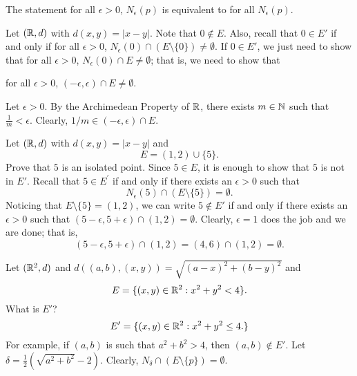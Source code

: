 \documentclass[a4paper]{report}
\begin{document}
\begin{remark}
    The statement for all \( \epsilon > 0 \), \( {N}_{\epsilon}(p) \) is equivalent to for all \( {N}_{\epsilon}(p) \).
\end{remark}

\begin{eg}
    Let \( (\mathbb{R}, d) \) with \( d(x,y) = | x - y |  \). Note that \(  0 \notin E  \). Also, recall that \( 0 \in E' \) if and only if for all \( \epsilon > 0  \), \( {N}_{\epsilon}(0) \cap (E \setminus  \{ 0  \} ) \neq \emptyset \). If \( 0 \in E' \), we just need to show that for all \( \epsilon > 0  \), \( {N}_{\epsilon}(0) \cap E \neq \emptyset \); that is, we need to show that  
    \begin{center}
        for all \( \epsilon > 0  \), \( (-\epsilon, \epsilon) \cap E \neq \emptyset \).
    \end{center}
    Let \( \epsilon > 0  \). By the Archimedean Property of \( \mathbb{R}  \), there exists \( m \in \mathbb{N}  \) such that \( \frac{ 1 }{ m }  < \epsilon  \). Clearly, \( 1/m \in (-\epsilon, \epsilon ) \cap E  \).
\end{eg}

\begin{eg}
   Let \( (\mathbb{R}, d) \) with \( d(x,y) = | x - y  |  \) and 
   \[  E = (1,2) \cup \{ 5  \}.  \]
   Prove that \( 5  \) is an isolated point.
   Since \( 5 \in E  \), it is enough to show that \( 5  \) is not in \( E' \). Recall that \( 5 \in E^{'}  \) if and only if there exists an \( \epsilon > 0  \) such that   
   \[  {N}_{\epsilon}(5) \cap (E \setminus  \{ 5 \} ) = \emptyset. \]
   Noticing that \( E \setminus  \{ 5  \} = (1,2) \), we can write \( 5 \notin E' \) if and only if there exists an \( \epsilon > 0  \) such that \( (5 - \epsilon , 5 + \epsilon) \cap (1,2) = \emptyset \). Clearly, \( \epsilon = 1  \) does the job and we are done; that is,
   \[  (5 - \epsilon, 5 + \epsilon) \cap (1,2) = (4, 6) \cap (1,2) = \emptyset. \]
\end{eg}

\begin{eg}
   Let \( (\mathbb{R}^{2}, d) \) and \( d((a,b),(x,y)) = \sqrt{ (a-x)^{2} + (b-y)^{2} }   \) 
   and 
   \[  E = \{ (x,y) \in \mathbb{R}^{2} : x^{2} + y^{2} < 4   \}. \]
   What is \( E' \)?
   \[  E' = \{ (x,y) \in \mathbb{R}^{2} : x^{2} + y^{2} \leq 4.  \}  \]
   For example, if \( (a,b) \) is such that \( a^{2} + b^{2} > 4  \), then \( (a,b) \notin E' \). Let \( \delta = \frac{ 1 }{ 2 }  (\sqrt{ a^{2} + b^{2} } - 2 ) \). Clearly, \( {N}_{\delta} \cap (E \setminus  \{ p \}  ) = \emptyset \).
\end{eg}
\end{document}
